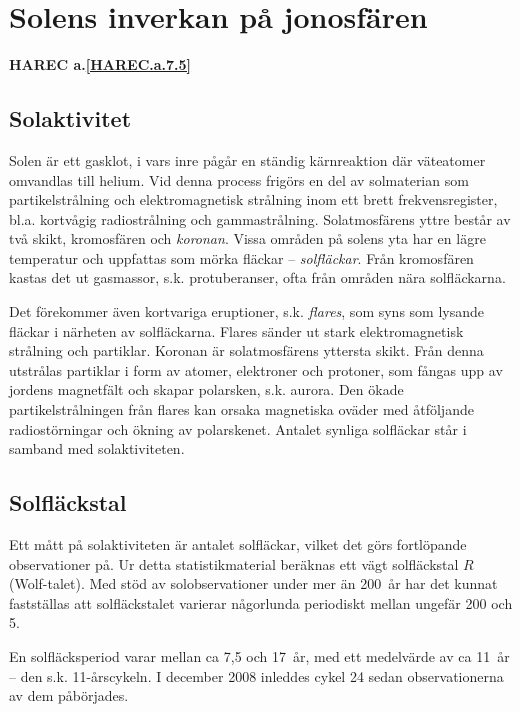 \section[Solens inverkan]{Solens inverkan på jonosfären}
\textbf{
HAREC a.\ref{HAREC.a.7.5}\label{myHAREC.a.7.5}
}

\subsection{Solaktivitet}

Solen är ett gasklot, i vars inre pågår en ständig kärnreaktion där
väteatomer omvandlas till helium.
Vid denna process frigörs en del av solmaterian som partikelstrålning och
elektromagnetisk strålning inom ett brett frekvensregister, bl.a. kortvågig
radiostrålning och gammastrålning.
Solatmosfärens yttre består av två skikt, kromosfären och \emph{koronan}.
Vissa områden på solens yta har en lägre temperatur och uppfattas som mörka
fläckar -- \emph{solfläckar}.
Från kromosfären kastas det ut gasmassor, s.k. protuberanser, ofta från områden
nära solfläckarna.

Det förekommer även kortvariga eruptioner, s.k. \emph{flares}, som syns som
lysande fläckar i närheten av solfläckarna.
Flares sänder ut stark elektromagnetisk strålning och partiklar.
Koronan är solatmosfärens yttersta skikt.
Från denna utstrålas partiklar i form av atomer, elektroner och protoner, som
fångas upp av jordens magnetfält och skapar polarsken, s.k. aurora.
Den ökade partikelstrålningen från flares kan orsaka magnetiska oväder med
åtföljande radiostörningar och ökning av polarskenet.
Antalet synliga solfläckar står i samband med solaktiviteten.

\subsection{Solfläckstal}

Ett mått på solaktiviteten är antalet solfläckar, vilket det görs
fortlöpande observationer på.
Ur detta statistikmaterial beräknas ett vägt solfläckstal \(R\) (Wolf-talet).
Med stöd av solobservationer under mer än 200~år har det kunnat fastställas att
solfläckstalet varierar någorlunda periodiskt mellan ungefär 200 och 5.

En solfläcksperiod varar mellan ca 7,5 och 17~år, med ett medelvärde
av ca 11~år -- den s.k. 11-årscykeln.
I december 2008 inleddes cykel 24 sedan observationerna av dem påbörjades.

